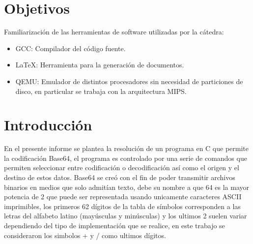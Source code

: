 \documentclass[titlepage,a4paper]{article}
\begin{document}
\tableofcontents %
\newpage


\section{Objetivos}\label{sec:objetivos}
Familiarización de las herramientas de software utilizadas por la cátedra:
\begin{itemize}
\item GCC: Compilador del código fuente.
\item \LaTeX: Herramienta para la generación de documentos.
\item QEMU: Emulador de distintos procesadores sin necesidad de particiones de disco, en particular se trabaja con la arquitectura MIPS.
\end{itemize}

\section{Introducción}\label{sec:intro}
En el presente informe se plantea la resolución de un programa en C que permite la codificación Base64, el programa es controlado por una serie de comandos que permiten seleccionar entre codificación o decodificación así como el origen y el destino de estos datos.
\newline 
Base64 se creó con el fin de poder transmitir archivos binarios en medios que solo admitían texto, debe su nombre a que 64 es la mayor potencia de 2 que puede ser representada usando unicamente caracteres ASCII imprimibles, los primeros 62 dígitos de la tabla de símbolos corresponden a las letras del alfabeto latino (mayúsculas y minúsculas) y los ultimos 2 suelen variar dependiendo del tipo de implementación que se realice, en este trabajo se consideraron los simbolos + y / como ultimos dígitos.
\end{document}
